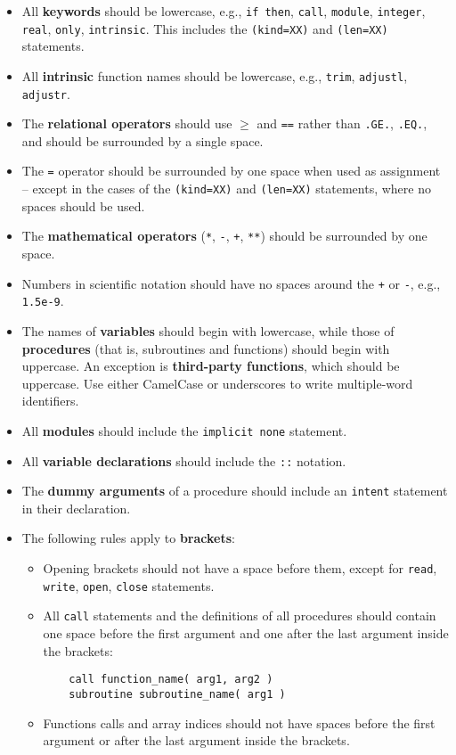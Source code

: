 \begin{itemize}
\item All \textbf{keywords} should be lowercase, e.g., \texttt{if\
    then}, \texttt{call}, \texttt{module}, \texttt{integer},
  \texttt{real}, \texttt{only}, \texttt{intrinsic}. This includes the
  \texttt{(kind=XX)} and \texttt{(len=XX)} statements.
\item All \textbf{intrinsic} function names should be lowercase, e.g.,
  \texttt{trim}, \texttt{adjustl}, \texttt{adjustr}.
\item The \textbf{relational operators} should use \texttt{$\geq$} and
  \texttt{==} rather than \texttt{.GE.}, \texttt{.EQ.}, and should be
  surrounded by a single space.
\item The \texttt{=} operator should be surrounded by one space when
  used as assignment -- except in the cases of the \texttt{(kind=XX)}
  and \texttt{(len=XX)} statements, where no spaces should be used.
\item The \textbf{mathematical operators} (\texttt{*}, \texttt{-},
  \texttt{+}, \texttt{**}) should be surrounded by one space.
\item Numbers in scientific notation should have no spaces around the
  \texttt{+} or \texttt{-}, e.g., \texttt{1.5e-9}.
\item The names of \textbf{variables} should begin with lowercase,
  while those of \textbf{procedures} (that is, subroutines and
  functions) should begin with uppercase. An exception is
  \textbf{third-party functions}, which should be uppercase. Use
  either CamelCase or underscores to write multiple-word identifiers.
\item All \textbf{modules} should include the \texttt{implicit none}
  statement.
\item All \textbf{variable declarations} should include the
  \texttt{::} notation.
\item The \textbf{dummy arguments} of a procedure should include an
  \texttt{intent} statement in their declaration.
\item The following rules apply to \textbf{brackets}:
  \begin{itemize}
  \item Opening brackets should not have a space before them, except
    for \texttt{read}, \texttt{write}, \texttt{open}, \texttt{close}
    statements.
  \item All \texttt{call} statements and the definitions of all
    procedures should contain one space before the first argument and
    one after the last argument inside the brackets:
    \begin{verbatim}
    call function_name( arg1, arg2 )
    subroutine subroutine_name( arg1 )
    \end{verbatim}
  \item Functions calls and array indices should not have spaces
    before the first argument or after the last argument inside the
    brackets.
  \end{itemize}
\end{itemize}
